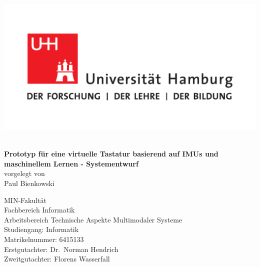 \frontmatter
{}
\begin{titlepage}
\includegraphics[scale=0.3]{UHH-Logo_2010_Farbe_CMYK.pdf}
\vspace*{2cm}
\Large
\begin{center}{\color{uhhred}\textbf{}}
\vspace*{2.0cm}\\
{\LARGE \textbf{Prototyp für eine virtuelle Tastatur basierend auf IMUs und maschinellem Lernen - Systementwurf}}
\vspace*{2.0cm}\\
vorgelegt von
\vspace*{0.4cm}\\
Paul Bienkowski
\end{center}

\vspace*{3.9cm}

\noindent
MIN-Fakultät \vspace*{0.4cm} \\
Fachbereich Informatik \vspace*{0.4cm} \\
Arbeitsbereich Technische Aspekte Multimodaler Systeme \vspace*{0.4cm} \\
Studiengang: Informatik \vspace*{0.4cm} \\
Matrikelnummer: 6415133 \vspace*{0.8cm} \\
Erstgutachter: Dr.~Norman Hendrich \vspace*{0.4cm} \\
Zweitgutachter: Florens Wasserfall

\end{titlepage}

\restoregeometry{}

